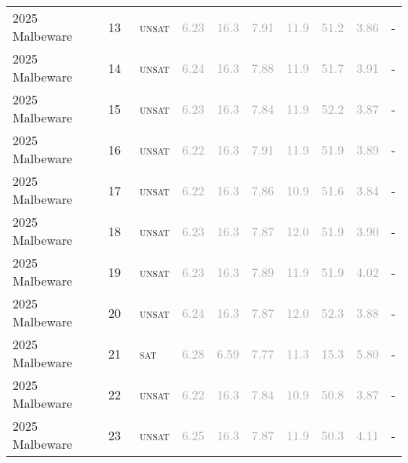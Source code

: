 \begin{center}
{\begin{longtable}{@{}llllllllll@{}}
2025 Malbeware & 13 & ~\textsc{unsat} & \textcolor{darkgray}{6.23} & \textcolor{darkgray}{16.3} & \textcolor{darkgray}{7.91} & \textcolor{darkgray}{11.9} & \textcolor{darkgray}{51.2} & \textcolor{darkgray}{3.86} & - \\
2025 Malbeware & 14 & ~\textsc{unsat} & \textcolor{darkgray}{6.24} & \textcolor{darkgray}{16.3} & \textcolor{darkgray}{7.88} & \textcolor{darkgray}{11.9} & \textcolor{darkgray}{51.7} & \textcolor{darkgray}{3.91} & - \\
2025 Malbeware & 15 & ~\textsc{unsat} & \textcolor{darkgray}{6.23} & \textcolor{darkgray}{16.3} & \textcolor{darkgray}{7.84} & \textcolor{darkgray}{11.9} & \textcolor{darkgray}{52.2} & \textcolor{darkgray}{3.87} & - \\
2025 Malbeware & 16 & ~\textsc{unsat} & \textcolor{darkgray}{6.22} & \textcolor{darkgray}{16.3} & \textcolor{darkgray}{7.91} & \textcolor{darkgray}{11.9} & \textcolor{darkgray}{51.9} & \textcolor{darkgray}{3.89} & - \\
2025 Malbeware & 17 & ~\textsc{unsat} & \textcolor{darkgray}{6.22} & \textcolor{darkgray}{16.3} & \textcolor{darkgray}{7.86} & \textcolor{darkgray}{10.9} & \textcolor{darkgray}{51.6} & \textcolor{darkgray}{3.84} & - \\
2025 Malbeware & 18 & ~\textsc{unsat} & \textcolor{darkgray}{6.23} & \textcolor{darkgray}{16.3} & \textcolor{darkgray}{7.87} & \textcolor{darkgray}{12.0} & \textcolor{darkgray}{51.9} & \textcolor{darkgray}{3.90} & - \\
2025 Malbeware & 19 & ~\textsc{unsat} & \textcolor{darkgray}{6.23} & \textcolor{darkgray}{16.3} & \textcolor{darkgray}{7.89} & \textcolor{darkgray}{11.9} & \textcolor{darkgray}{51.9} & \textcolor{darkgray}{4.02} & - \\
2025 Malbeware & 20 & ~\textsc{unsat} & \textcolor{darkgray}{6.24} & \textcolor{darkgray}{16.3} & \textcolor{darkgray}{7.87} & \textcolor{darkgray}{12.0} & \textcolor{darkgray}{52.3} & \textcolor{darkgray}{3.88} & - \\
2025 Malbeware & 21 & ~\textsc{sat} & \textcolor{darkgray}{6.28} & \textcolor{darkgray}{6.59} & \textcolor{darkgray}{7.77} & \textcolor{darkgray}{11.3} & \textcolor{darkgray}{15.3} & \textcolor{darkgray}{5.80} & - \\
2025 Malbeware & 22 & ~\textsc{unsat} & \textcolor{darkgray}{6.22} & \textcolor{darkgray}{16.3} & \textcolor{darkgray}{7.84} & \textcolor{darkgray}{10.9} & \textcolor{darkgray}{50.8} & \textcolor{darkgray}{3.87} & - \\
2025 Malbeware & 23 & ~\textsc{unsat} & \textcolor{darkgray}{6.25} & \textcolor{darkgray}{16.3} & \textcolor{darkgray}{7.87} & \textcolor{darkgray}{11.9} & \textcolor{darkgray}{50.3} & \textcolor{darkgray}{4.11} & - \\

\end{longtable}}
\end{center}
